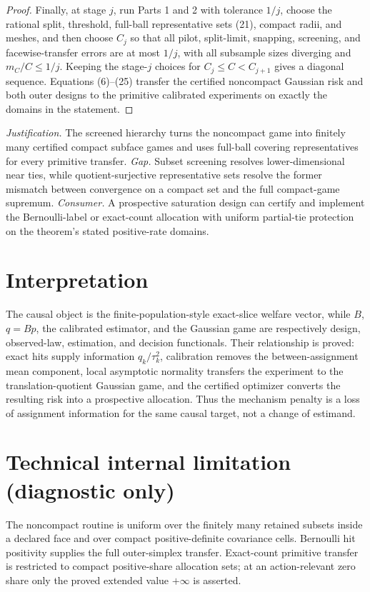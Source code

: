 \documentclass{article}
\begin{document}
\begin{proof}
Finally, at stage \(j\), run Parts 1 and 2 with tolerance \(1/j\), choose the rational split, threshold, full-ball representative sets (21), compact radii, and meshes, and then choose \(C_j\) so that all pilot, split-limit, snapping, screening, and facewise-transfer errors are at most \(1/j\), with all subsample sizes diverging and \(m_C/C\leq1/j\).  Keeping the stage-\(j\) choices for \(C_j\leq C<C_{j+1}\) gives a diagonal sequence.  Equations (6)--(25) transfer the certified noncompact Gaussian risk and both outer designs to the primitive calibrated experiments on exactly the domains in the statement.
\end{proof}
\par\smallskip\noindent \textit{Justification.} The screened hierarchy turns the noncompact game into finitely many certified compact subface games and uses full-ball covering representatives for every primitive transfer. \textit{Gap.} Subset screening resolves lower-dimensional near ties, while quotient-surjective representative sets resolve the former mismatch between convergence on a compact set and the full compact-game supremum. \textit{Consumer.} A prospective saturation design can certify and implement the Bernoulli-label or exact-count allocation with uniform partial-tie protection on the theorem's stated positive-rate domains.

\section{Interpretation}

The causal object is the finite-population-style exact-slice welfare vector, while \(B\), \(q=Bp\), the calibrated estimator, and the Gaussian game are respectively design, observed-law, estimation, and decision functionals.  Their relationship is proved: exact hits supply information \(q_k/\tau_k^2\), calibration removes the between-assignment mean component, local asymptotic normality transfers the experiment to the translation-quotient Gaussian game, and the certified optimizer converts the resulting risk into a prospective allocation.  Thus the mechanism penalty is a loss of assignment information for the same causal target, not a change of estimand.

\section*{Technical internal limitation (diagnostic only)}

The noncompact routine is uniform over the finitely many retained subsets inside a declared face and over compact positive-definite covariance cells. Bernoulli hit positivity supplies the full outer-simplex transfer. Exact-count primitive transfer is restricted to compact positive-share allocation sets; at an action-relevant zero share only the proved extended value \(+\infty\) is asserted.
\end{document}
